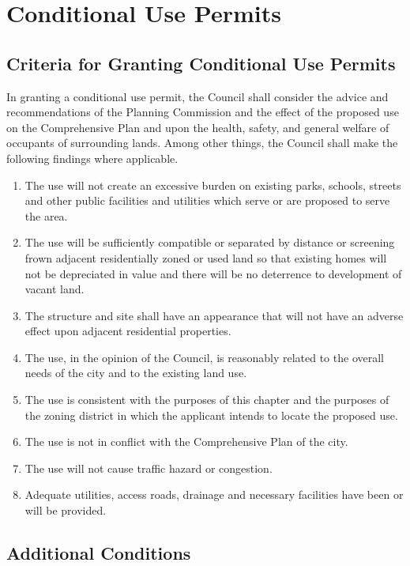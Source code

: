 \section{Conditional Use Permits}
\subsection{Criteria for Granting Conditional Use Permits}
In granting a conditional use permit, the Council shall consider the advice and recommendations of the Planning Commission and the effect of the proposed use on the Comprehensive Plan and upon the health, safety, and general welfare of occupants of surrounding lands. Among other things, the Council shall make the following findings where applicable.
\begin{enumerate}[{\indent}1)]
    \item The use will not create an excessive burden on existing parks, schools, streets and other public facilities and utilities which serve or are proposed to serve the area.
    \item The use will be sufficiently compatible or separated by distance or screening frown adjacent residentially zoned or used land so that existing homes will not be depreciated in value and there will be no deterrence to development of vacant land.
    \item The structure and site shall have an appearance that will not have an adverse effect upon adjacent residential properties.
    \item The use, in the opinion of the Council, is reasonably related to the overall needs of the city and to the existing land use.
    \item The use is consistent with the purposes of this chapter and the purposes of the zoning district in which the applicant intends to locate the proposed use.
    \item The use is not in conflict with the Comprehensive Plan of the city.
    \item The use will not cause traffic hazard or congestion.
    \item Adequate utilities, access roads, drainage and necessary facilities have been or will be provided.
\end{enumerate}
\subsection{Additional Conditions}
